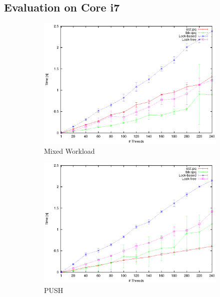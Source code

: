 \subsection{Evaluation on Core i7}
\begin{figure}
	\centering
	\begin{subfigure}[b]{0.3\textwidth}
		\centering
		\includegraphics[width=\textwidth]{../plots/i7_mixed/runtime_mixed_i7}
		\caption{Mixed Workload}
		\label{fig:i7_mixed}
	\end{subfigure}
	\hfill
	\begin{subfigure}[b]{0.3\textwidth}
		\centering
		\includegraphics[width=\textwidth]{../plots/i7_push/runtime_push_i7}
		\caption{PUSH}
		\label{fig:i7_push}
	\end{subfigure}
	\hfill
	\begin{subfigure}[b]{0.3\textwidth}

\end{subfigure}
\end{figure}
